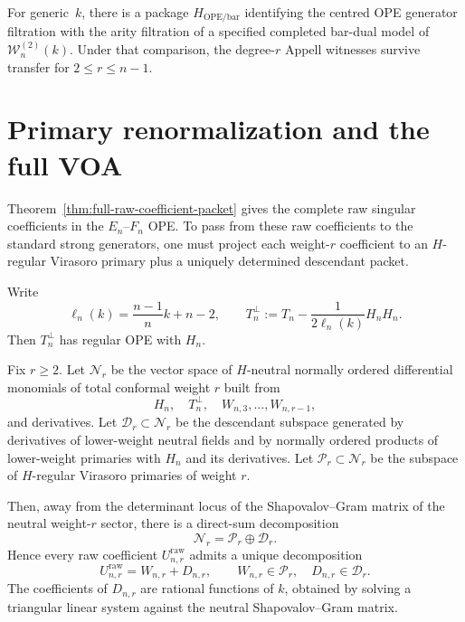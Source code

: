 \begin{conjecture}
\label{conj:minimal-degree-subregular}
For generic~$k$, there is a package $H_{\mathrm{OPE/bar}}$ identifying the
centred OPE generator filtration with the arity filtration of a specified
completed bar-dual model of $\mathcal W_n^{(2)}(k)$.  Under that comparison,
the degree-$r$ Appell witnesses survive transfer for $2\le r\le n-1$.
\end{conjecture}

\section{Primary renormalization and the full VOA}

Theorem~\ref{thm:full-raw-coefficient-packet} gives the complete raw singular
coefficients in the $E_n$--$F_n$ OPE. To pass from these raw coefficients to
the standard strong generators, one must project each weight-$r$ coefficient to
an $H$-regular Virasoro primary plus a uniquely determined descendant packet.

\begin{definition}
\label{def:orthogonal-stress}
Write
\[
\ell_n(k)=\frac{n-1}{n}k+n-2,
\qquad
T_n^\perp:=T_n-\frac{1}{2\ell_n(k)}H_nH_n.
\]
Then $T_n^\perp$ has regular OPE with $H_n$.
\end{definition}

\begin{theorem}
\label{thm:triangular-primary-renormalization}
Fix $r\geq 2$. Let $\mathcal N_r$ be the vector space of $H$-neutral
normally ordered differential monomials of total conformal weight $r$ built from
\[
H_n,\quad T_n^\perp,\quad W_{n,3},\dots,W_{n,r-1},
\]
and derivatives. Let $\mathcal D_r\subset \mathcal N_r$ be the descendant
subspace generated by derivatives of lower-weight neutral fields and by
normally ordered products of lower-weight primaries with $H_n$ and its
derivatives. Let $\mathcal P_r\subset \mathcal N_r$ be the subspace of
$H$-regular Virasoro primaries of weight $r$.

Then, away from the determinant locus of the Shapovalov--Gram matrix of the
neutral weight-$r$ sector, there is a direct-sum decomposition
\[
\mathcal N_r=\mathcal P_r\oplus \mathcal D_r.
\]
Hence every raw coefficient $U_{n,r}^{\mathrm{raw}}$ admits a unique
decomposition
\[
U_{n,r}^{\mathrm{raw}}=W_{n,r}+D_{n,r},
\qquad
W_{n,r}\in \mathcal P_r,
\quad
D_{n,r}\in \mathcal D_r.
\]
The coefficients of $D_{n,r}$ are rational functions of $k$, obtained by
solving a triangular linear system against the neutral Shapovalov--Gram matrix.
\end{theorem}

